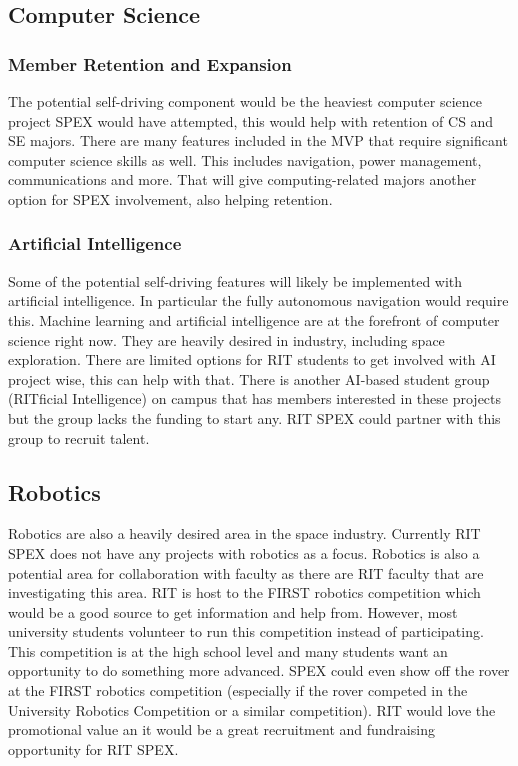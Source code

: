 \documentclass[conference]{IEEEtran} %
\begin{document}
\subsection{Computer Science}
\label{subsec:cs}
\subsubsection{Member Retention and Expansion}
\label{subsubsec:cs}
The potential self-driving component would be the heaviest computer science project SPEX would have attempted, this would help with retention of CS and SE majors. 
There are many features included in the MVP that require significant computer science skills as well.
This includes navigation, power management, communications and more.
That will give computing-related majors another option for SPEX involvement, also helping retention.

\subsubsection{Artificial Intelligence}
\label{subsubsec:ai}
Some of the potential self-driving features will likely be implemented with artificial intelligence. In particular the fully autonomous navigation would require this.
Machine learning and artificial intelligence are at the forefront of computer science right now. 
They are heavily desired in industry, including space exploration.
There are limited options for RIT students to get involved with AI project wise, this can help with that. 
There is another AI-based student group (RITficial Intelligence) on campus that has members interested in these projects but the group lacks the funding to start any.
RIT SPEX could partner with this group to recruit talent.

\subsection{Robotics}
\label{subsec:robotics}
Robotics are also a heavily desired area in the space industry. 
Currently RIT SPEX does not have any projects with robotics as a focus. 
Robotics is also a potential area for collaboration with faculty as there are RIT faculty that are investigating this area.
RIT is host to the FIRST robotics competition which would be a good source to get information and help from. 
However, most university students volunteer to run this competition instead of participating. 
This competition is at the high school level and many students want an opportunity to do something more advanced. 
SPEX could even show off the rover at the FIRST robotics competition (especially if the rover competed in the University Robotics Competition or a similar competition). 
RIT would love the promotional value an it would be a great recruitment and fundraising opportunity for RIT SPEX.
\end{document}

